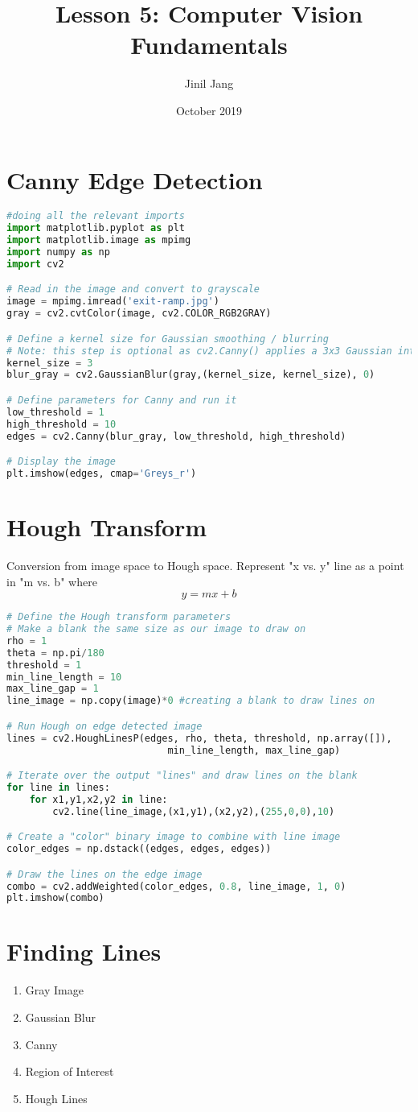\documentclass[12pt]{article}
\title{Lesson 5: Computer Vision Fundamentals}
\author{Jinil Jang }
\date{October 2019}
\begin{document}
\maketitle

\section{Canny Edge Detection}

\begin{lstlisting}[language=Python]
#doing all the relevant imports
import matplotlib.pyplot as plt
import matplotlib.image as mpimg
import numpy as np
import cv2

# Read in the image and convert to grayscale
image = mpimg.imread('exit-ramp.jpg')
gray = cv2.cvtColor(image, cv2.COLOR_RGB2GRAY)

# Define a kernel size for Gaussian smoothing / blurring
# Note: this step is optional as cv2.Canny() applies a 3x3 Gaussian internally
kernel_size = 3
blur_gray = cv2.GaussianBlur(gray,(kernel_size, kernel_size), 0)

# Define parameters for Canny and run it
low_threshold = 1
high_threshold = 10
edges = cv2.Canny(blur_gray, low_threshold, high_threshold)

# Display the image
plt.imshow(edges, cmap='Greys_r')
\end{lstlisting}

\section{Hough Transform}
Conversion from image space to Hough space.
Represent "x vs. y" line as a point in "m vs. b" where
\[y = mx + b\]

\begin{lstlisting}[language=Python]
# Define the Hough transform parameters
# Make a blank the same size as our image to draw on
rho = 1
theta = np.pi/180
threshold = 1
min_line_length = 10
max_line_gap = 1
line_image = np.copy(image)*0 #creating a blank to draw lines on

# Run Hough on edge detected image
lines = cv2.HoughLinesP(edges, rho, theta, threshold, np.array([]),
                            min_line_length, max_line_gap)

# Iterate over the output "lines" and draw lines on the blank
for line in lines:
    for x1,y1,x2,y2 in line:
        cv2.line(line_image,(x1,y1),(x2,y2),(255,0,0),10)

# Create a "color" binary image to combine with line image
color_edges = np.dstack((edges, edges, edges)) 

# Draw the lines on the edge image
combo = cv2.addWeighted(color_edges, 0.8, line_image, 1, 0) 
plt.imshow(combo)
\end{lstlisting}

\section{Finding Lines}
\begin{enumerate}
    \item Gray Image
    \item Gaussian Blur
    \item Canny
    \item Region of Interest
    \item Hough Lines
\end{enumerate}
\end{document}
